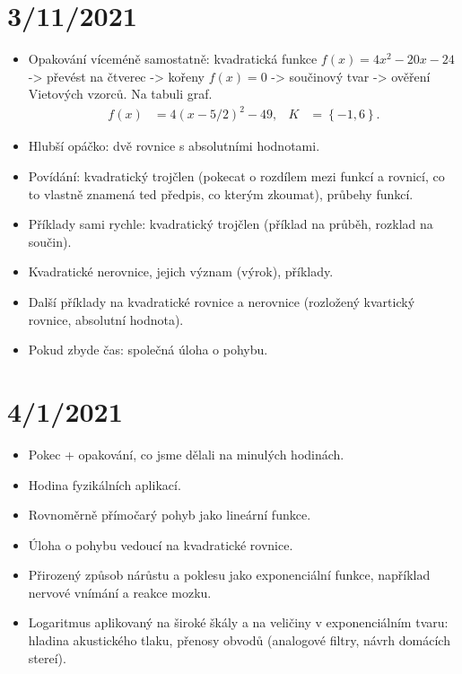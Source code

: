 \documentclass[11pt,a4paper]{article}
\begin{document}
    \section*{3/11/2021}
        \begin{itemize}
            \item Opakování víceméně samostatně: kvadratická funkce $f(x) = 4x^2 -20x - 24$ -> převést na čtverec -> kořeny $f(x) = 0$ -> součinový tvar -> ověření Vietových vzorců. Na tabuli graf.
            \begin{align*}
                f(x) &= 4 (x - 5/2)^2 - 49,
            &
                K &= \left\{ -1, 6 \right\}.
            \end{align*}

            \item Hlubší opáčko: dvě rovnice s absolutními hodnotami.
            \item Povídání: kvadratický trojčlen (pokecat o rozdílem mezi funkcí a rovnicí, co to vlastně znamená ted předpis, co kterým zkoumat), průbehy funkcí.
            \item Příklady sami rychle: kvadratický trojčlen (příklad na průběh, rozklad na součin).
            \item Kvadratické nerovnice, jejich význam (výrok), příklady.
            \item Další příklady na kvadratické rovnice a nerovnice (rozložený kvartický rovnice, absolutní hodnota).
            \item Pokud zbyde čas: společná úloha o pohybu.
        \end{itemize}

    \section*{4/1/2021}
        \begin{itemize}
            \item Pokec + opakování, co jsme dělali na minulých hodinách.
            \item Hodina fyzikálních aplikací.
            \item Rovnoměrně přímočarý pohyb jako lineární funkce.
            \item Úloha o pohybu vedoucí na kvadratické rovnice.
            \item Přirozený způsob nárůstu a poklesu jako exponenciální funkce, například nervové vnímání a reakce mozku.
            \item Logaritmus aplikovaný na široké škály a na veličiny v exponenciálním tvaru: hladina akustického tlaku, přenosy obvodů (analogové filtry, návrh domácích stereí).
        \end{itemize}
\end{document}
